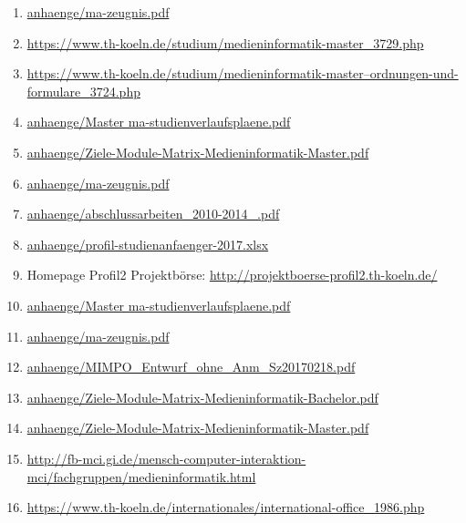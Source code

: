 \documentclass[BCOR12mm,DIV11,titlepage,a4paper,oneside,10pt]{scrbook}
\begin{document}
\begin{enumerate}
\item{\href{anhaenge/ma-zeugnis.pdf}{anhaenge/ma-zeugnis.pdf} } 
\item{\href{https://www.th-koeln.de/studium/medieninformatik-master\_3729.php}{https://www.th-koeln.de/studium/medieninformatik-master\_3729.php} } 
\item{\href{https://www.th-koeln.de/studium/medieninformatik-master--ordnungen-und-formulare\_3724.php}{https://www.th-koeln.de/studium/medieninformatik-master--ordnungen-und-formulare\_3724.php} } 
\item{\href{anhaenge/Master ma-studienverlaufsplaene.pdf}{anhaenge/Master ma-studienverlaufsplaene.pdf} } 
\item{\href{anhaenge/Ziele-Module-Matrix-Medieninformatik-Master.pdf}{anhaenge/Ziele-Module-Matrix-Medieninformatik-Master.pdf} } 
\item{\href{anhaenge/ma-zeugnis.pdf}{anhaenge/ma-zeugnis.pdf} } 
\item{\href{anhaenge/abschlussarbeiten\_2010-2014\_.pdf}{anhaenge/abschlussarbeiten\_2010-2014\_.pdf} } 
\item{\href{anhaenge/profil-studienanfaenger-2017.xlsx}{anhaenge/profil-studienanfaenger-2017.xlsx} } 
\item{Homepage Profil2 Projektbörse: \href{http://projektboerse-profil2.th-koeln.de/}{http://projektboerse-profil2.th-koeln.de/} } 
\item{\href{anhaenge/Master ma-studienverlaufsplaene.pdf}{anhaenge/Master ma-studienverlaufsplaene.pdf} } 
\item{\href{anhaenge/ma-zeugnis.pdf}{anhaenge/ma-zeugnis.pdf} } 
\item{\href{anhaenge/MIMPO\_Entwurf\_ohne\_Anm\_Sz20170218.pdf}{anhaenge/MIMPO\_Entwurf\_ohne\_Anm\_Sz20170218.pdf} } 
\item{\href{anhaenge/Ziele-Module-Matrix-Medieninformatik-Bachelor.pdf}{anhaenge/Ziele-Module-Matrix-Medieninformatik-Bachelor.pdf} } 
\item{\href{anhaenge/Ziele-Module-Matrix-Medieninformatik-Master.pdf}{anhaenge/Ziele-Module-Matrix-Medieninformatik-Master.pdf} } 
\item{\href{http://fb-mci.gi.de/mensch-computer-interaktion-mci/fachgruppen/medieninformatik.html}{http://fb-mci.gi.de/mensch-computer-interaktion-mci/fachgruppen/medieninformatik.html} } 
\item{\href{https://www.th-koeln.de/internationales/international-office\_1986.php}{https://www.th-koeln.de/internationales/international-office\_1986.php} } 

\end{enumerate}
\end{document}

